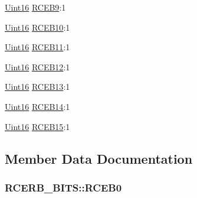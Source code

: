 \begin{DoxyCompactItemize}
\item 
\hyperlink{_d_s_p2833x___device_8h_a59a9f6be4562c327cbfb4f7e8e18f08b}{Uint16} \hyperlink{struct_r_c_e_r_b___b_i_t_s_a00e72701f7fff40994e5b5fa70f53ccc}{R\+C\+E\+B9}\+:1
\item 
\hyperlink{_d_s_p2833x___device_8h_a59a9f6be4562c327cbfb4f7e8e18f08b}{Uint16} \hyperlink{struct_r_c_e_r_b___b_i_t_s_af3083c967bdead3c5df883ed7d47c666}{R\+C\+E\+B10}\+:1
\item 
\hyperlink{_d_s_p2833x___device_8h_a59a9f6be4562c327cbfb4f7e8e18f08b}{Uint16} \hyperlink{struct_r_c_e_r_b___b_i_t_s_aee346d9549bb142786f170d4ea4b3f5c}{R\+C\+E\+B11}\+:1
\item 
\hyperlink{_d_s_p2833x___device_8h_a59a9f6be4562c327cbfb4f7e8e18f08b}{Uint16} \hyperlink{struct_r_c_e_r_b___b_i_t_s_a71a886f2fa226d06353324c9aa30d131}{R\+C\+E\+B12}\+:1
\item 
\hyperlink{_d_s_p2833x___device_8h_a59a9f6be4562c327cbfb4f7e8e18f08b}{Uint16} \hyperlink{struct_r_c_e_r_b___b_i_t_s_a33f9ee7c5bfcac20343576cafdd5c6f4}{R\+C\+E\+B13}\+:1
\item 
\hyperlink{_d_s_p2833x___device_8h_a59a9f6be4562c327cbfb4f7e8e18f08b}{Uint16} \hyperlink{struct_r_c_e_r_b___b_i_t_s_aedacf82b20c12e0316d35f9a5b01b32a}{R\+C\+E\+B14}\+:1
\item 
\hyperlink{_d_s_p2833x___device_8h_a59a9f6be4562c327cbfb4f7e8e18f08b}{Uint16} \hyperlink{struct_r_c_e_r_b___b_i_t_s_a510f7fac62deda2c0e5c69ba27e2689f}{R\+C\+E\+B15}\+:1
\end{DoxyCompactItemize}


\subsection{Member Data Documentation}
\hypertarget{struct_r_c_e_r_b___b_i_t_s_a6cf4b944d8b23346fdb17e39171a2c9a}{}
\subsubsection[{R\+C\+E\+B0}]{ R\+C\+E\+R\+B\+\_\+\+B\+I\+T\+S\+::\+R\+C\+E\+B0}\label{struct_r_c_e_r_b___b_i_t_s_a6cf4b944d8b23346fdb17e39171a2c9a}
\hypertarget{struct_r_c_e_r_b___b_i_t_s_aa67ace46a5a4a938b486aed4395a9fbb}{}
